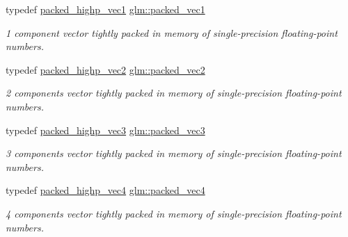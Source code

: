 \begin{DoxyCompactItemize}
typedef \hyperlink{group__gtc__type__aligned_ga0356e10a8b10f699cf7cf4308f449c83}{packed\+\_\+highp\+\_\+vec1} \hyperlink{group__gtc__type__aligned_ga1722068e0357aca709e5002f20cc043f}{glm\+::packed\+\_\+vec1}
\begin{DoxyCompactList}\small\item\em 1 component vector tightly packed in memory of single-\/precision floating-\/point numbers. \end{DoxyCompactList}\item 
\mbox{\label{group__gtc__type__aligned_ga702841b8b37825c9a51d95bc0f7848b2}} 
typedef \hyperlink{group__gtc__type__aligned_ga15068ebf3dae2c205d90b1d36780bf9b}{packed\+\_\+highp\+\_\+vec2} \hyperlink{group__gtc__type__aligned_ga702841b8b37825c9a51d95bc0f7848b2}{glm\+::packed\+\_\+vec2}
\begin{DoxyCompactList}\small\item\em 2 components vector tightly packed in memory of single-\/precision floating-\/point numbers. \end{DoxyCompactList}\item 
\mbox{\label{group__gtc__type__aligned_ga8e23eba0ebe21b912cd783f69fa3a99b}} 
typedef \hyperlink{group__gtc__type__aligned_ga6814dd861e658e724ce9e5e673a4486b}{packed\+\_\+highp\+\_\+vec3} \hyperlink{group__gtc__type__aligned_ga8e23eba0ebe21b912cd783f69fa3a99b}{glm\+::packed\+\_\+vec3}
\begin{DoxyCompactList}\small\item\em 3 components vector tightly packed in memory of single-\/precision floating-\/point numbers. \end{DoxyCompactList}\item 
\mbox{\label{group__gtc__type__aligned_gacb6d3e09d6aa52d954934e570b5c4fb1}} 
typedef \hyperlink{group__gtc__type__aligned_gabbc42b2b5ad854c60821526c4e291161}{packed\+\_\+highp\+\_\+vec4} \hyperlink{group__gtc__type__aligned_gacb6d3e09d6aa52d954934e570b5c4fb1}{glm\+::packed\+\_\+vec4}
\begin{DoxyCompactList}\small\item\em 4 components vector tightly packed in memory of single-\/precision floating-\/point numbers. \end{DoxyCompactList}\item 
\mbox{\label{group__gtc__type__aligned_ga81fe4410dc880770293c53fcba83c9e4}} 

\end{DoxyCompactItemize}
